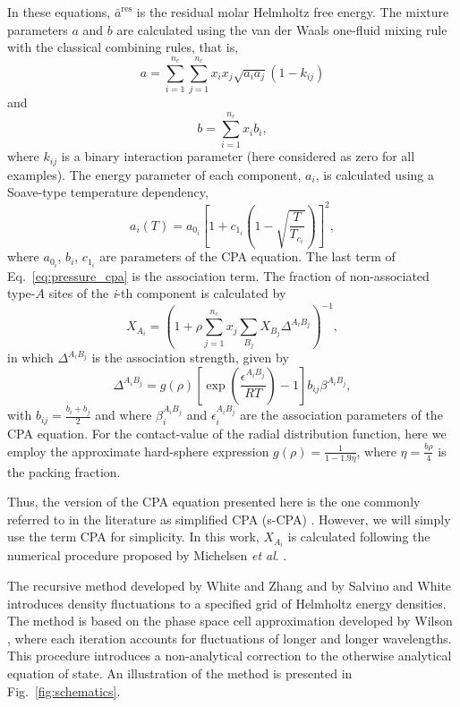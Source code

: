 \documentclass[preprint,12pt,3p]{elsarticle}
\begin{document}
In these equations, $\bar{a}^\text{res}$ is the residual molar Helmholtz free energy.
The mixture parameters $a$ and $b$ are calculated using the van der Waals one-fluid mixing rule with the classical combining rules, that is,
\begin{equation}
a = \sum_{i=1}^{n_c} \sum_{j=1}^{n_c} x_{i}x_{j}\sqrt{a_{i}a_{j}}(1-k_{ij})
\end{equation}
and
\begin{equation}
b = \sum_{i=1}^{n_c}x_{i}b_{i},
\end{equation}
where $k_{ij}$ is a binary interaction parameter (here considered as zero for all examples).
The energy parameter of each component, $a_{i}$, is calculated using a Soave-type temperature dependency,
\begin{equation}
a_{i}(T) = a_{0_{i}}\left[1+c_{1_{i}}\left(1-\sqrt{\frac{T}{T_{c_{i}}}}\right)\right]^2,
\end{equation}
where $a_{0_{i}}$, $b_{i}$, $c_{1_{i}}$ are parameters of the CPA equation.
The last term of Eq.~\ref{eq:pressure_cpa} is the association term.
The fraction of non-associated type-$A$ sites of the \textit{i}-th component is calculated by
\begin{equation} \label{eq:frac_nb}
X_{A_{i}} = \left(1+\rho \sum_{j=1}^{n_c} x_{j} \sum_{B_{j}} X_{B_{j}} \Delta^{A_{i}B_{j}}\right)^{-1},
\end{equation}
in which $\Delta^{A_{i}B_{j}}$ is the association strength, given by
\begin{equation} \label{eq:delta_cpa}
\Delta^{A_{i}B_{j}} = g(\rho)\left[\exp\left(\frac{\epsilon^{A_{i}B_{j}}}{RT}\right)-1\right]b_{ij}\beta^{A_{i}B_{j}},
\end{equation}
with $b_{ij} = \frac{b_{i}+b_{j}}{2}$ and where $\beta_{i}^{A_{i}B_{j}}$ and $\epsilon_{i}^{A_{i}B_{j}}$ are the association parameters of the CPA equation.
For the contact-value of the radial distribution function, here we employ the approximate hard-sphere expression $g(\rho) = \frac{1}{1-1.9\eta}$, where $\eta = \frac{b\rho}{4}$ is the packing fraction.

Thus, the version of the CPA equation presented here is the one commonly referred to in the literature as simplified CPA (s-CPA) \citep{kontogeorgis1999multicomponent}. However, we will simply use the term CPA for simplicity.
In this work, $X_{A_{i}}$ is calculated following the numerical procedure proposed by Michelsen \textit{et al}. \cite{michelsen2006robust}.

The recursive method developed by White and Zhang \cite{white1993renormalization, white1995renormalization, white1998renormalization} and by Salvino and White \citep{salvino1992calculation} introduces density fluctuations to a specified grid of Helmholtz energy densities.
The method is based on the phase space cell approximation developed by Wilson \cite{wilson1971renormalization, wilson1971brenormalization}, where each iteration accounts for fluctuations of longer and longer wavelengths.
This procedure introduces a non-analytical correction to the otherwise analytical equation of state.
An illustration of the method is presented in Fig.~\ref{fig:schematics}.
\end{document}
